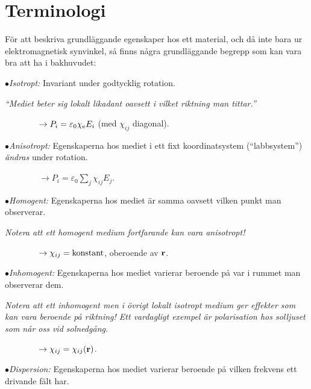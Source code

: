 \section{Terminologi}
F{\"o}r att beskriva grundl{\"a}ggande egenskaper hos ett material, och d{\aa}
inte bara ur elektromagnetisk synvinkel, s{\aa} finns n{\aa}gra
grundl{\"a}ggande begrepp som kan vara bra att ha i bakhuvudet:
\medskip
\item{$\bullet$}{{\it Isotropt:} Invariant under godtycklig rotation.}
\item{}{{\it ``Mediet beter sig lokalt likadant oavsett i vilket riktning man
      tittar.''}}
\smallskip
\item{}{$\displaystyle \qquad\qquad\to P_i=\varepsilon_0\chi_{\rm e}E_i$\hskip20pt (med $\chi_{ij}$ diagonal).}
\smallskip
\item{$\bullet$}{{\it Anisotropt:} Egenskaperna hos mediet i ett fixt
      koordinatsystem (``labbsystem'') {\it {\"a}ndras} under rotation.}
\smallskip
\item{}{$\displaystyle \qquad\qquad\to P_i=\varepsilon_0\sum_{j}\chi_{ij}E_j$.}
\smallskip
\item{$\bullet$}{{\it Homogent:} Egenskaperna hos mediet {\"a}r samma oavsett
      vilken punkt man observerar.}
\item{}{{\it Notera att ett homogent medium fortfarande kan vara anisotropt!}}
\smallskip
\item{}{$\displaystyle \qquad\qquad\to \chi_{ij}=\hbox{konstant}$,
      oberoende av ${\bf r}$.}
\smallskip
\item{$\bullet$}{{\it Inhomogent:} Egenskaperna hos mediet varierar
      beroende p{\aa} var i rummet man observerar dem.}
\item{}{{\it Notera att ett inhomogent men i {\"o}vrigt lokalt isotropt
      medium ger effekter som kan vara beroende p{\aa} riktning!
      Ett vardagligt exempel {\"a}r polarisation hos solljuset som n{\aa}r
      oss vid solnedg{\aa}ng.}}
\smallskip
\item{}{$\displaystyle \qquad\qquad\to \chi_{ij}=\chi_{ij}({\bf r})$.}
\smallskip
\item{$\bullet$}{{\it Dispersion:} Egenskaperna hos mediet varierar beroende
      p{\aa} vilken frekvens ett drivande f{\"a}lt har.}
